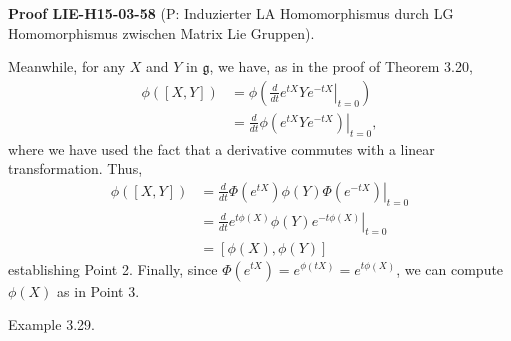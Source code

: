 \documentclass[10pt, letterpaper]{article}
\newcommand{\CustomHeading}[3]{%
  \par\medskip\noindent%
  \textbf{#1 #2} \textnormal{(#3)}.\enskip%
}
\newenvironment{PROOF}[2]{\begin{unitbox}\CustomHeading{Proof}{#1}{#2}}{\end{unitbox}}
\begin{document}
\begin{PROOF}{LIE-H15-03-58}{P: Induzierter LA Homomorphismus durch LG Homomorphismus zwischen Matrix Lie Gruppen}
Meanwhile, for any $X$ and $Y$ in $\mathfrak{g}$, we have, as in the proof of Theorem 3.20,
$$
\begin{aligned}
\phi([X, Y]) & =\phi\left(\left.\frac{d}{d t} e^{t X} Y e^{-t X}\right|_{t=0}\right) \\
& =\left.\frac{d}{d t} \phi\left(e^{t X} Y e^{-t X}\right)\right|_{t=0},
\end{aligned}
$$
where we have used the fact that a derivative commutes with a linear transformation. Thus,
$$
\begin{aligned}
\phi([X, Y]) & =\left.\frac{d}{d t} \Phi\left(e^{t X}\right) \phi(Y) \Phi\left(e^{-t X}\right)\right|_{t=0} \\
& =\left.\frac{d}{d t} e^{t \phi(X)} \phi(Y) e^{-t \phi(X)}\right|_{t=0} \\
& =[\phi(X), \phi(Y)]
\end{aligned}
$$
establishing Point 2. Finally, since $\Phi\left(e^{t X}\right)=e^{\phi(t X)}=e^{t \phi(X)}$, we can compute $\phi(X)$ as in Point 3.
\end{PROOF}





Example 3.29. 
\end{document}
